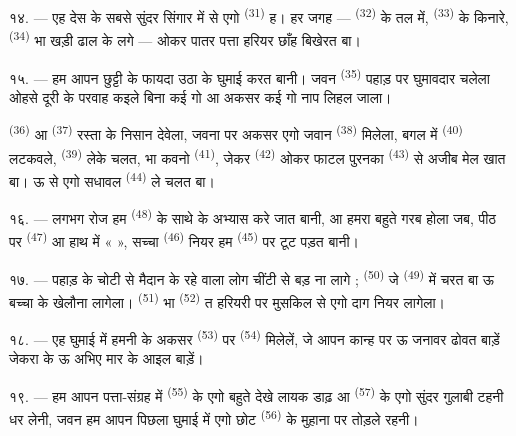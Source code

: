 १४. --- एह देस के सबसे सुंदर सिंगार में से एगो 
\textsuperscript{(31)} ह। हर जगह —  \textsuperscript{(32)} के
तल में,  \textsuperscript{(33)} के किनारे,
 \textsuperscript{(34)} भा खड़ी ढाल के लगे — ओकर पातर
पत्ता हरियर छाँह बिखेरत बा।

\VUsaut{3.0mm}
\VUsaut{3.0mm}

१५. --- हम आपन छुट्टी के फायदा उठा के  घुमाई करत बानी।
जवन  \textsuperscript{(35)} पहाड़ पर घुमावदार चलेला ओहसे
दूरी के परवाह कइले बिना कई गो  आ अकसर कई गो
 नाप लिहल जाला।

 \textsuperscript{(36)} आ 
\textsuperscript{(37)} रस्ता के निसान देवेला, जवना पर अकसर एगो जवान
 \textsuperscript{(38)} मिलेला, बगल में 
\textsuperscript{(40)} लटकवले,  \textsuperscript{(39)} लेके
चलत, भा कवनो  \textsuperscript{(41)}, जेकर  \textsuperscript{(42)} ओकर फाटल पुरनका 
\textsuperscript{(43)} से अजीब मेल खात बा। ऊ  से एगो सधावल
 \textsuperscript{(44)} ले चलत बा।

\VUsaut{3.0mm}

१६. --- लगभग रोज हम  \textsuperscript{(48)} के
साथे  के अभ्यास करे जात बानी, आ हमरा बहुते गरब होला जब,
पीठ पर  \textsuperscript{(47)} आ हाथ में «  », सच्चा  \textsuperscript{(46)} नियर हम
 \textsuperscript{(45)} पर टूट पड़त बानी।

१७. --- पहाड़ के चोटी से मैदान के रहे वाला लोग चींटी से बड़ ना लागे ;
 \textsuperscript{(50)} जे 
\textsuperscript{(49)} में चरत बा ऊ बच्चा के खेलौना लागेला।
 \textsuperscript{(51)} भा 
\textsuperscript{(52)} त हरियरी पर मुसकिल से एगो दाग नियर लागेला।

१८. --- एह घुमाई में हमनी के अकसर  \textsuperscript{(53)}
पर  \textsuperscript{(54)} मिलेलें, जे आपन कान्ह
पर ऊ जनावर ढोवत बाड़ें जेकरा के ऊ अभिए मार के आइल बाड़ें।

१९. --- हम आपन पत्ता-संग्रह में  \textsuperscript{(55)} के
एगो बहुते देखे लायक डाढ़ आ  \textsuperscript{(57)} के एगो
सुंदर गुलाबी टहनी धर लेनी, जवन हम आपन पिछला घुमाई में एगो छोट
 \textsuperscript{(56)} के मुहाना पर तोड़ले रहनी।

